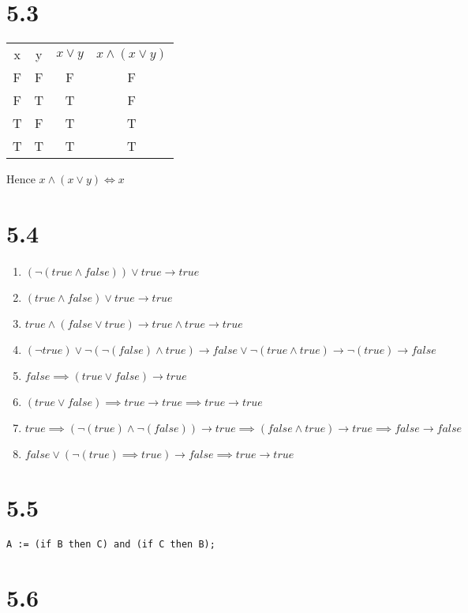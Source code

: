 \documentclass{article}
\begin{document}
\section*{5.3}

\begin{tabular}{ c | c | c | c }
x & y  & $x \lor y$ & $x \land (x \lor y)$ \\
F & F  &   F    &       F \\
F & T  &   T    &       F \\
T & F  &   T    &       T \\
T & T  &   T    &       T \\
\end{tabular}

Hence $x \land (x \lor y) \iff x$

\section*{5.4}
\begin{enumerate}[label=\alph*)]
\item $ (\neg (true \land false)) \lor true \rightarrow true $
\item $ (true \land false) \lor true \rightarrow true $
\item $ true \land (false \lor true) \rightarrow true \land true \rightarrow true $
\item $ (\neg true) \lor \neg(\neg(false) \land true) \rightarrow false \lor \neg(true \land true) \rightarrow \neg(true) \rightarrow false $
\item $ false \implies (true \lor false) \rightarrow true $
\item $ (true \lor false) \implies true \rightarrow true \implies true \rightarrow true $
\item $ true \implies (\neg (true) \land \neg(false)) \rightarrow true \implies (false \land true) \rightarrow true \implies false \rightarrow false $
\item $ false \lor (\neg(true) \implies true) \rightarrow false \implies true \rightarrow true $
\end{enumerate}

\section*{5.5}
\begin{verbatim}
A := (if B then C) and (if C then B);
\end{verbatim}

\section*{5.6}
\end{document}
